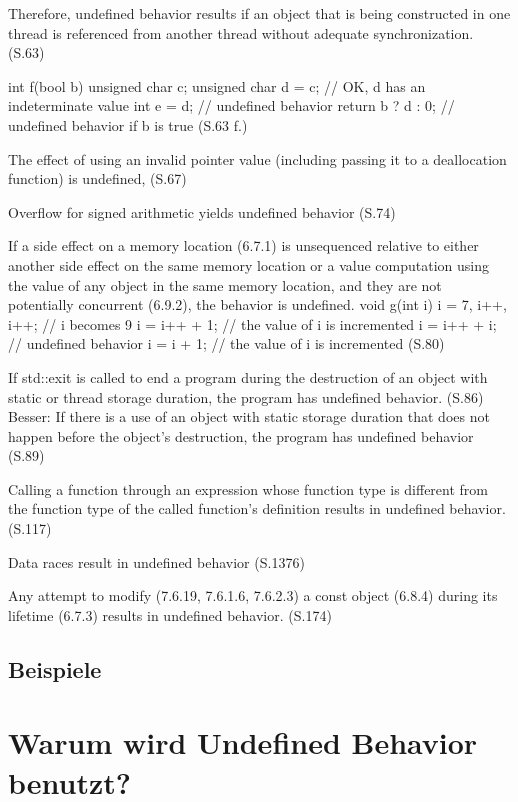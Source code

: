 Therefore, undefined behavior results if an object that is being constructed in one thread is referenced from
another thread without adequate synchronization. (S.63)

int f(bool b) {
        unsigned char c;
        unsigned char d = c; // OK, d has an indeterminate value
        int e = d; // undefined behavior
        return b ? d : 0; // undefined behavior if b is true
    }
(S.63 f.)

The effect of using an invalid pointer value (including passing it to a deallocation function) is undefined,
(S.67)

Overflow for signed arithmetic yields undefined behavior
(S.74)

If a side effect on a memory location (6.7.1) is unsequenced relative to either another
side effect on the same memory location or a value computation using the value of any object in the same
memory location, and they are not potentially concurrent (6.9.2), the behavior is undefined.
void g(int i) {
        i = 7, i++, i++; // i becomes 9
        i = i++ + 1; // the value of i is incremented
        i = i++ + i; // undefined behavior
        i = i + 1; // the value of i is incremented
    }
(S.80)

If std::exit is called to
end a program during the destruction of an object with static or thread storage duration, the program has
undefined behavior.
(S.86)
Besser: If there is a use of an object with static storage duration that does not happen before the object’s destruction,
the program has undefined behavior
(S.89)

Calling a function through an expression whose function type is different from the function type of the called
function’s definition results in undefined behavior.
(S.117)

Data races result in undefined behavior
(S.1376)

Any attempt to modify (7.6.19, 7.6.1.6, 7.6.2.3) a const object (6.8.4) during its lifetime (6.7.3) results in
undefined behavior.
(S.174)



\subsection{Beispiele}
\label{subsec:ub_beispiele}

\section{Warum wird Undefined Behavior benutzt?}
\label{sec:ub_warum}
